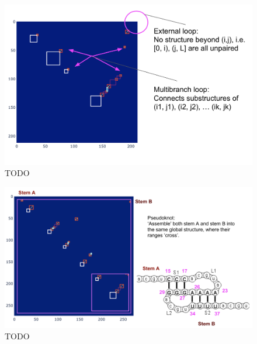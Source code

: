 \documentclass[12pt]{article}
\begin{document}
\begin{figure}[h]
    \centering
    \includegraphics[width=\textwidth]{plot/non_local_structures_2d_matrix.png}
    \caption{TODO}
    \label{fig:non_local_structures_2d_matrix}
    \centering
\end{figure}


\begin{figure}[h]
    \centering
    \includegraphics[width=\textwidth]{plot/non_local_structures_pseudoknot.png}
    \caption{TODO}
    \label{fig:non_local_structures_pseudoknot}
    \centering
\end{figure}
\end{document}
